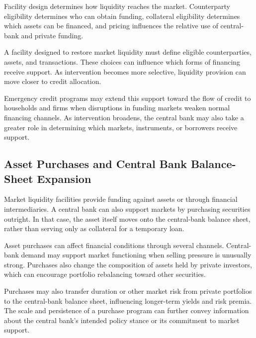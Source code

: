 Facility design determines how liquidity reaches the market. Counterparty eligibility determines who can obtain funding, collateral eligibility determines which assets can be financed, and pricing influences the relative use of central-bank and private funding.
\begin{tcolorbox}[
enhanced,
breakable,
colback=white,
colframe=FinanceBlue,
boxrule=0.7pt,
sharp corners,
borderline west={2.2pt}{0pt}{FinanceBlue},
title=\textbf{Financial Perspective: Market Support Can Become Credit Allocation},
coltitle=white,
colbacktitle=FinanceBlue,
fonttitle=\bfseries,
before skip=1.2em,
after skip=1.2em
]

A facility designed to restore market liquidity must define eligible counterparties, assets, and transactions. These choices can influence which forms of financing receive support. As intervention becomes more selective, liquidity provision can move closer to credit allocation.

\end{tcolorbox}


Emergency credit programs may extend this support toward the flow of credit to households and firms when disruptions in funding markets weaken normal financing channels. As intervention broadens, the central bank may also take a greater role in determining which markets, instruments, or borrowers receive support.

\subsection{Asset Purchases and Central Bank Balance-Sheet Expansion}

Market liquidity facilities provide funding against assets or through financial intermediaries. A central bank can also support markets by purchasing securities outright. In that case, the asset itself moves onto the central-bank balance sheet, rather than serving only as collateral for a temporary loan.

Asset purchases can affect financial conditions through several channels. Central-bank demand may support market functioning when selling pressure is unusually strong. Purchases also change the composition of assets held by private investors, which can encourage portfolio rebalancing toward other securities.

Purchases may also transfer duration or other market risk from private portfolios to the central-bank balance sheet, influencing longer-term yields and risk premia. The scale and persistence of a purchase program can further convey information about the central bank's intended policy stance or its commitment to market support.

